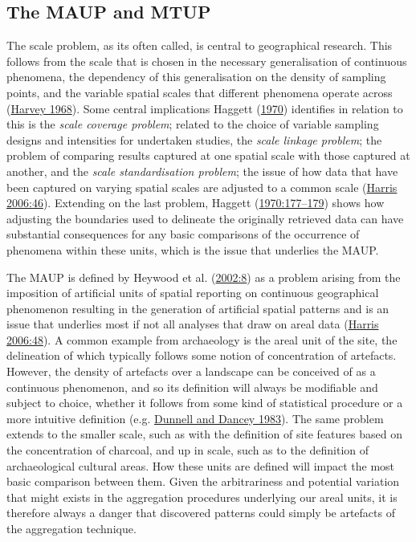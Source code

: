 \documentclass[
  12pt,
  a4paper,
  oneside]{book}
\begin{document}
\hypertarget{modifiable}{%
\subsection{The MAUP and MTUP}\label{modifiable}}

The scale problem, as its often called, is central to geographical research. This follows from the scale that is chosen in the necessary generalisation of continuous phenomena, the dependency of this generalisation on the density of sampling points, and the variable spatial scales that different phenomena operate across (\protect\hyperlink{ref-harvey1968}{Harvey 1968}). Some central implications Haggett (\protect\hyperlink{ref-haggett1970}{1970}) identifies in relation to this is the \emph{scale coverage problem}; related to the choice of variable sampling designs and intensities for undertaken studies, the \emph{scale linkage problem}; the problem of comparing results captured at one spatial scale with those captured at another, and the \emph{scale standardisation problem}; the issue of how data that have been captured on varying spatial scales are adjusted to a common scale (\protect\hyperlink{ref-harris2006}{Harris 2006:46}). Extending on the last problem, Haggett (\protect\hyperlink{ref-haggett1970}{1970:177--179}) shows how adjusting the boundaries used to delineate the originally retrieved data can have substantial consequences for any basic comparisons of the occurrence of phenomena within these units, which is the issue that underlies the MAUP.

The MAUP is defined by Heywood et al. (\protect\hyperlink{ref-heywood2002}{2002:8}) as \textquotesingle a problem arising from the imposition of artificial units of spatial reporting on continuous geographical phenomenon resulting in the generation of artificial spatial patterns\textquotesingle{} and is an issue that underlies most if not all analyses that draw on areal data (\protect\hyperlink{ref-harris2006}{Harris 2006:48}). A common example from archaeology is the areal unit of the site, the delineation of which typically follows some notion of concentration of artefacts. However, the density of artefacts over a landscape can be conceived of as a continuous phenomenon, and so its definition will always be modifiable and subject to choice, whether it follows from some kind of statistical procedure or a more intuitive definition (e.g. \protect\hyperlink{ref-dunnell1983}{Dunnell and Dancey 1983}). The same problem extends to the smaller scale, such as with the definition of site features based on the concentration of charcoal, and up in scale, such as to the definition of archaeological cultural areas. How these units are defined will impact the most basic comparison between them. Given the arbitrariness and potential variation that might exists in the aggregation procedures underlying our areal units, it is therefore always a danger that discovered patterns could simply be artefacts of the aggregation technique.
\end{document}
